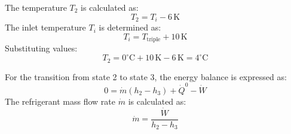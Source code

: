 The temperature \( T_2 \) is calculated as:  
\[
T_2 = T_i - 6 \, \text{K}
\]  
The inlet temperature \( T_i \) is determined as:  
\[
T_i = T_{\text{triple}} + 10 \, \text{K}
\]  
Substituting values:  
\[
T_2 = 0^\circ \text{C} + 10 \, \text{K} - 6 \, \text{K} = 4^\circ \text{C}
\]  

For the transition from state 2 to state 3, the energy balance is expressed as:  
\[
0 = \dot{m} (h_2 - h_3) + \dot{Q}^0 - \dot{W}
\]  
The refrigerant mass flow rate \( \dot{m} \) is calculated as:  
\[
\dot{m} = \frac{\dot{W}}{h_2 - h_3}
\]
